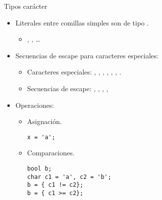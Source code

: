 \begin{frame}[fragile]{Tipos carácter}
\begin{itemize}
  \item Literales entre comillas simples son de tipo .
    \begin{itemize}
      \item {}, , \ldots
    \end{itemize}
  \item Secuencias de escape para caracteres especiales:
    \begin{itemize}
      \item Caracteres especiales: , , 
        , ,
        , , 
        .
      \item Secuencias de escape:
        \cppkey{\textbackslash{}\textbackslash}, 
        , 
        , 
        , 
    \end{itemize}
  \item Operaciones:
    \begin{itemize}
      \item Asignación.
\begin{lstlisting}
x = 'a';
\end{lstlisting}
      \item Comparaciones.
\begin{lstlisting}
bool b;
char c1 = 'a', c2 = 'b';
b = { c1 != c2};
b = { c1 >= c2};
\end{lstlisting}
    \end{itemize}
\end{itemize}
\end{frame}

